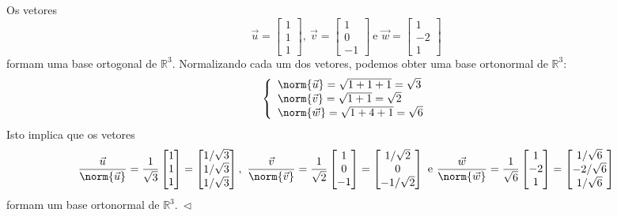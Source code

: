 \begin{ex}
	Os vetores
	\begin{equation}
	\vec{u} =
	\begin{bmatrix}
	1 \\ 1 \\ 1
	\end{bmatrix}, \
	\vec{v} =
	\begin{bmatrix}
	1 \\ 0 \\ -1
	\end{bmatrix} \ \text{e }
	\vec{w} =
	\begin{bmatrix}
	1 \\ -2 \\ 1
	\end{bmatrix}
	\end{equation} formam uma base ortogonal de $\mathbb{R}^3$. Normalizando cada um dos vetores, podemos obter uma base ortonormal de $\mathbb{R}^3$:
	\begin{equation}
	\left\{
	\begin{array}{ll}
	\norm{\vec{u}} = \sqrt{1 + 1 + 1} = \sqrt{3} \\
	\norm{\vec{v}} = \sqrt{1 + 1} = \sqrt{2} \\
	\norm{\vec{w}} = \sqrt{1 + 4 + 1} = \sqrt{6} \\
	\end{array}
	\right.
	\end{equation} Isto implica que os vetores
	\begin{equation}
	\frac{\vec{u}}{\norm{\vec{u}}} = \frac{1}{\sqrt{3}}
	\begin{bmatrix}
	1 \\ 1 \\ 1
	\end{bmatrix} =
	\begin{bmatrix}
	1/\sqrt{3} \\ 1/\sqrt{3} \\ 1/\sqrt{3}
	\end{bmatrix}, \
	\frac{\vec{v}}{\norm{\vec{v}}} = \frac{1}{\sqrt{2}}
	\begin{bmatrix}
	1 \\ 0 \\ -1
	\end{bmatrix} =
	\begin{bmatrix}
	1/\sqrt{2} \\ 0 \\ -1/\sqrt{2}
	\end{bmatrix} \ \text{e }
	\frac{\vec{w}}{\norm{\vec{w}}} = \frac{1}{\sqrt{6}}
	\begin{bmatrix}
	1 \\ -2 \\ 1
	\end{bmatrix} =
	\begin{bmatrix}
	1/\sqrt{6} \\ -2/\sqrt{6} \\ 1/\sqrt{6}
	\end{bmatrix}
	\end{equation} formam um base ortonormal de $\mathbb{R}^3. \ \lhd$
\end{ex}

